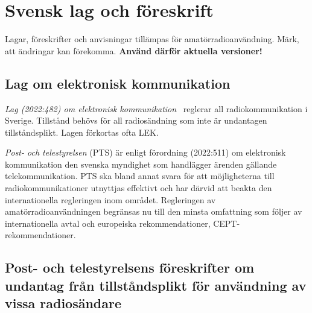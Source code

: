\section{Svensk lag och föreskrift}
\label{svensk lag och föreskrift}

Lagar, föreskrifter och anvisningar tillämpas för
  amatörradioanvändning.
Märk, att ändringar kan förekomma.
\textbf{Använd därför aktuella versioner!}


\subsection{Lag om elektronisk kommunikation}

\emph{Lag (2022:482) om elektronisk kommunikation}~\cite{SFS2022:482} reglerar
all radiokommunikation i Sverige.
Tillstånd behövs för all radiosändning som inte är undantagen tillståndsplikt.
Lagen förkortas ofta LEK.

\emph{Post- och telestyrelsen} (PTS) är enligt förordning (2022:511) om
elektronisk kommunikation den svenska myndighet som handlägger ärenden gällande
telekommunikation.
PTS ska bland annat svara för att möjligheterna till radiokommunikationer
utnyttjas effektivt och har därvid att beakta den internationella regleringen
inom området.
Regleringen av amatörradioanvändningen begränsas nu till den minsta omfattning
som följer av internationella avtal och europeiska rekommendationer,
CEPT-rekommendationer.

\newpage %
\subsection{Post- och telestyrelsens föreskrifter om
undantag från tillståndsplikt för användning av
vissa radiosändare}
\label{PTSFS2025:1}


